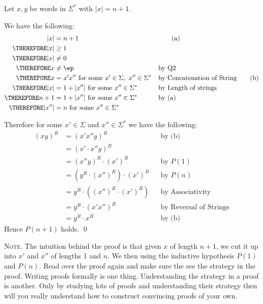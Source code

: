 Let $x,y$ be words in $\Sigma^*$ with $|x| = n + 1$.

We have the following:
\begin{align*}
           |x| &= n + 1                                                   & & \tag{a} \\ 
\THEREFORE |x| &\geq 1 \\
\THEREFORE |x| &\neq 0 \\
\THEREFORE x &\neq \ep                                          & & \text{by Q2} \\
\THEREFORE x &= x'x'' \text{ for some } x' \in \Sigma, \ x'' \in \Sigma^* & & \text{by Concatenation of String} \tag{b} \\
\THEREFORE |x| &= 1 + |x''| \text{ for some } x'' \in \Sigma^*            & & \text{by Length of strings} \\
\THEREFORE n + 1 &= 1 + |x''| \text{ for some } x'' \in \Sigma^*          & & \text{by (a)} \\
\THEREFORE |x''| &= n \text{ for some } x'' \in \Sigma^*
\end{align*}

Therefore for some $x' \in \Sigma$ and $x'' \in \Sigma^*$
we have the following:
\begin{align*}
(xy)^R
&= \left( x' x'' y \right)^R                      & & \text{by (b)} \\
&= (x' \cdot x''y)^R                                               \\
&= (x''y)^R \cdot (x')^R                         & & \text{by $P(1)$}\\
&= \left( y^R \cdot (x'')^R \right) \cdot (x')^R & & \text{by $P(n)$} \\
&= y^R \cdot \left( (x'')^R \cdot (x')^R \right) & & \text{by Associativity}\\
&= y^R \cdot \left( x' x'' \right)^R              & & \text{by Reversal of Strings}\\
&= y^R \cdot x^R                    & & \text{by (b)} 
\end{align*}
Hence $P(n+1)$ holds.
\qed


\textsc{Note.}
The intuition behind the proof is that 
given $x$ of length $n + 1$,
we cut it up into $x'$ and $x''$ of lengths 1 and $n$.
We then using the inductive hypothesis $P(1)$ and $P(n)$.
Read over the proof again and make sure the see the strategy
in the proof.
Writing proofs formally is one thing.
Understanding the strategy in a proof is another.
Only by studying lots of proofs and understanding their strategy
then will you really understand how to construct convincing proofs
of your own.

